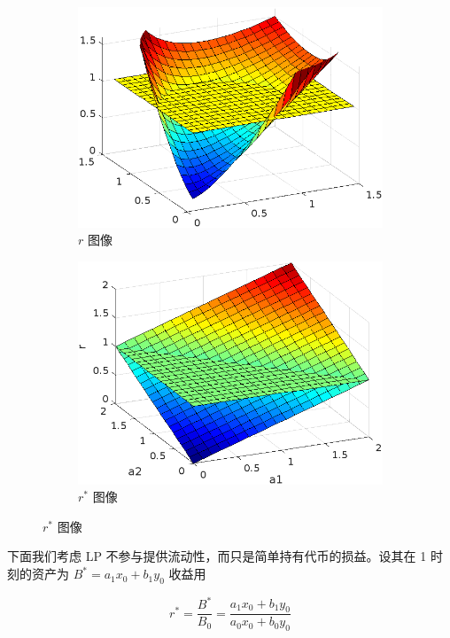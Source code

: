 \documentclass[12pt, a4paper, oneside]{ctexart}
\begin{document}
\begin{figure}
    \begin{subfigure}{0.5\textwidth}
        \centering
        \includegraphics*[width=\textwidth]{r.png}
        \caption{$r$ 图像}
    \end{subfigure}
    \begin{subfigure}{0.5\textwidth}
        \centering
        \includegraphics*[width=\textwidth]{r_.png}
        \caption{$r^*$ 图像}
    \end{subfigure}
\end{figure}

下面我们考虑 LP 不参与提供流动性，而只是简单持有代币的损益。设其在 1 时刻的资产为 $B^* = a_1x_0+b_1y_0$ 收益用

\begin{equation}
    r^* = \frac{B^*}{B_0} = \frac{a_1x_0+b_1y_0}{a_0x_0+b_0y_0}
\end{equation}
\end{document}
